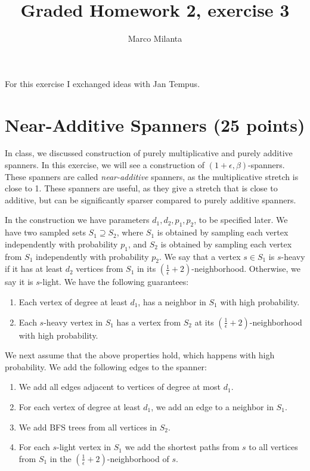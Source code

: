 \documentclass[11pt]{article}
\begin{document}
\author{Marco Milanta}
\title{Graded Homework 2, exercise 3}

\maketitle


For this exercise I exchanged ideas with Jan Tempus.
\section*{Near-Additive Spanners (25 points)}

In class, we discussed construction of purely multiplicative and purely additive spanners. In this exercise, we will see a construction of $(1+\epsilon,\beta)$-spanners. These spanners are called \emph{near-additive} spanners, as the multiplicative stretch is close to 1. These spanners are useful, as they give a stretch that is close to additive, but can be significantly sparser compared to purely additive spanners.

In the construction we have parameters $d_1,d_2,p_1,p_2$, to be specified later.
We have two sampled sets $S_1 \supseteq S_2$, where $S_1$ is obtained by sampling each vertex independently with probability $p_1$, and $S_2$ is obtained by sampling each vertex from $S_1$ independently with probability $p_2$.
We say that a vertex $s \in S_1$ is $s$-heavy if it has at least $d_2$ vertices from $S_1$ in its $(\frac{1}{\epsilon} + 2)$-neighborhood. Otherwise, we say it is $s$-light.
We have the following guarantees:
\begin{enumerate}
    \item Each vertex of degree at least $d_1$, has a neighbor in $S_1$ with high probability.
    \item Each $s$-heavy vertex in $S_1$ has a vertex from $S_2$ at its $(\frac{1}{\epsilon} + 2)$-neighborhood with high probability. 
\end{enumerate}

We next assume that the above properties hold, which happens with high probability.
We add the following edges to the spanner:
\begin{enumerate}
    \item We add all edges adjacent to vertices of degree at most $d_1$.
    \item For each vertex of degree at least $d_1$, we add an edge to a neighbor in $S_1$.
    \item We add BFS trees from all vertices in $S_2$.
    \item For each $s$-light vertex in $S_1$ we add the shortest paths from $s$ to all vertices from $S_1$ in the $(\frac{1}{\epsilon} + 2)$-neighborhood of $s$. 
\end{enumerate}
\end{document}
